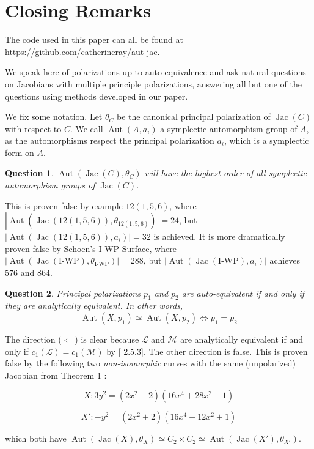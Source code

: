 \documentclass[12pt,reqno]{amsart}
\DeclareMathOperator{\Aut}{Aut}
\DeclareMathOperator{\Jac}{Jac}
\newcommand{\Z}{\mathbb{Z}}
\newcommand{\mc}{\mathcal}
\newtheorem*{question}{Question}
\theoremstyle{definition}
\theoremstyle{remark}
\begin{document}
\section{Closing Remarks}
\label{sec:questions}

The code used in this paper can all be found at \url{https://github.com/catherineray/aut-jac}.

We speak here of polarizations up to auto-equivalence and ask natural questions on Jacobians with multiple principle polarizations, answering all but one of the questions using methods developed in our paper.

We fix some notation. Let $\theta_C$ be the canonical principal polarization of $\Jac(C)$ with respect to $C$. We call $\Aut(A, a_i)$ a symplectic automorphism group of $A$, as the automorphisms respect the principal polarization $a_i$, which is a symplectic form on $A$.

\begin{question} $\Aut(\Jac(C), \theta_C)$ will have the highest order of all symplectic automorphism groups of $\Jac(C)$. \end{question}

This is proven false by example $12(1,5,6)$, where $|\Aut(\Jac(12(1, 5, 6)), \theta_{12(1, 5, 6)})| = 24$, but $|\Aut(\Jac(12(1, 5, 6)), a_i)| = 32$ is achieved. It is more dramatically proven false by Schoen's I-WP Surface, where $|\Aut(\Jac(\text{I-WP}), \theta_{\text{I-WP}})| = 288$, but $|\Aut(\Jac(\text{I-WP}), a_i)|$ achieves $576$ and $864$.

\begin{question} Principal polarizations $p_1$ and $p_2$ are auto-equivalent if and only if they are analytically equivalent. In other words, $$\Aut(X, p_1) \simeq \Aut(X, p_2) \Leftrightarrow p_1 = p_2$$ \end{question}

The direction ($\Leftarrow$) is clear because $\mc{L}$ and $\mc{M}$ are analytically equivalent if and only if $c_1(\mc{L}) = c_1(\mc{M})$ by [\cite{bl} 2.5.3]. The other direction is false.  This is proven false by the following two \textit{non-isomorphic} curves with the same (unpolarized) Jacobian from Theorem 1  \cite{howe1}:

$$X: 3y^2 = (2x^2- 2)(16x^4 + 28x^2 + 1)$$ 

$$X': -y^2 = (2x^2 + 2)(16x^4 + 12x^2 + 1)$$ 

which both have $\Aut(\Jac(X), \theta_X)\simeq C_2 \times C_2 \simeq \Aut(\Jac(X'), \theta_{X'})$. %
\end{document}
